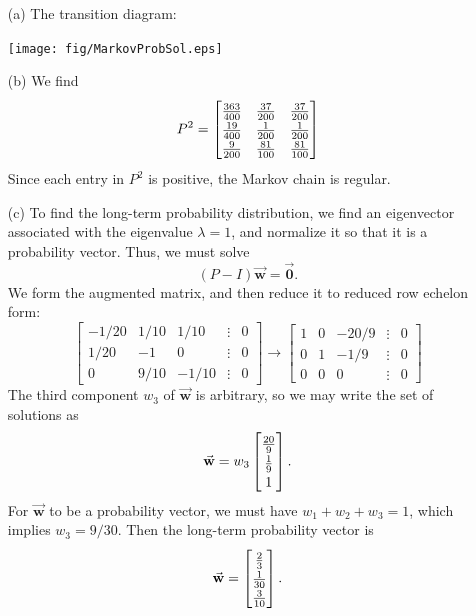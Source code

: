 \documentclass[reqno]{immbook}
\newcommand{\BW}{\vec{\textbf{w}}}
\newcommand{\BZero}{\vec{\textbf{0}}}  %
\newcommand{\T}{\rule{0pt}{2.6ex}}
\newcommand{\B}{\rule[-1.2ex]{0pt}{0pt}}
\numberwithin{equation}{chapter}
\numberwithin{question}{section}
\numberwithin{theorem}{chapter}
\numberwithin{figure}{chapter}
\theoremstyle{definition}
\begin{document}
\begin{enumerate}
\item[(a)] The transition diagram:

\medskip
\centerline{%
\texttt{[image: fig/MarkovProbSol.eps]}
}
\medskip

\item[(b)]
We find
\[
  P ^2= \begin{bmatrix}
           \frac{363}{400} & \frac{37}{200} & \frac{37}{200} \T\B \\
	   \frac{19}{400} & \frac{1}{200}   & \frac{1}{200} \B  \\
	   \frac{9}{200}    & \frac{81}{100} & \frac{81}{100} \B
      \end{bmatrix}
\]
Since each entry in $P^2$ is positive, the Markov chain is regular.
\item[(c)]
To find the long-term probability distribution, we find an eigenvector
associated with the eigenvalue $\lambda=1$, and normalize it so that
it is a probability vector.
Thus, we must solve
\[
  (P-I)\BW = \BZero.
\]
We form the augmented matrix,
and then reduce it to reduced row echelon form:
\[
\begin{bmatrix}
   -1/20 & 1/10 & 1/10 & \vdots & 0 \\
   1/20  &   -1  &  0   & \vdots & 0 \\
   0     &  9/10 & -1/10 & \vdots & 0
\end{bmatrix}
\rightarrow
\begin{bmatrix}
   1  &   0  & -20/9  & \vdots & 0 \\
   0  &   1  & -1/9   & \vdots & 0 \\
   0  &   0  &  0     & \vdots & 0
\end{bmatrix}
\]
The third component $w_3$ of $\BW$ is arbitrary, so we may write
the set of solutions as
\[
   \BW = w_3 \begin{bmatrix}
               \frac{20}{9} \T\B \\ \frac{1}{9} \B\\ 1
             \end{bmatrix} .
\]
For $\BW$ to be a probability vector, we must have $w_1+w_2+w_3=1$,
which implies $w_3 = 9/30$.  Then the long-term probability vector
is
\[
  \BW = \begin{bmatrix}
          \frac{2}{3} \T\B \\ \frac{1}{30} \B \\ \frac{3}{10} \B
        \end{bmatrix} .
\]
\end{enumerate}
\end{document}
